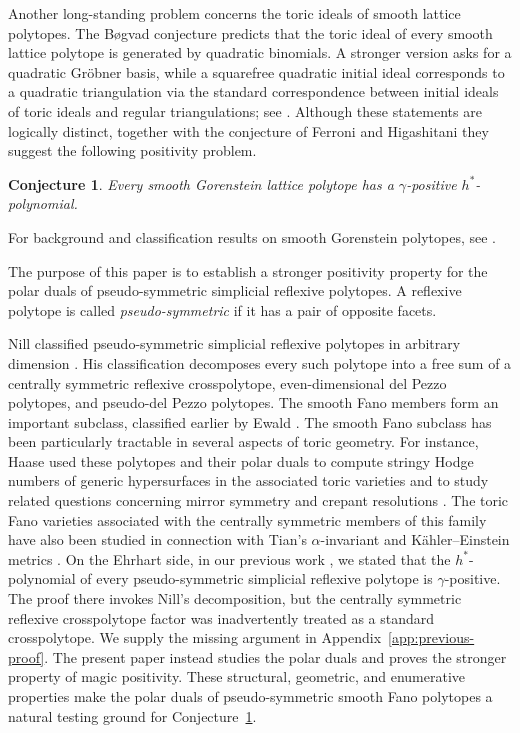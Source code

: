 \documentclass[12pt]{amsart}
\newtheorem{Conjecture}[Theorem]{Conjecture}
\theoremstyle{definition}
\begin{document}
Another long-standing problem concerns the toric ideals of smooth
lattice polytopes. The B{\o}gvad conjecture predicts that the toric ideal
of every smooth lattice polytope is generated by quadratic binomials.
A stronger version asks
for a quadratic Gr\"obner basis, while a squarefree quadratic initial ideal
corresponds to a quadratic triangulation via the standard correspondence
between initial ideals of toric ideals and regular triangulations; see
\cite[Chapter~8]{SturmfelsGBCP}.  Although these statements are logically
distinct, together with the conjecture of Ferroni and Higashitani they
suggest the following positivity problem.

\begin{Conjecture}\label{conj:smooth-gorenstein}
Every smooth Gorenstein lattice polytope has a $\gamma$-positive
$h^*$-polynomial.
\end{Conjecture}

For background and classification results on smooth Gorenstein polytopes,
see \cite{LorenzNill}.

The purpose of this paper is to establish a stronger positivity property
for the polar duals of pseudo-symmetric simplicial reflexive polytopes.
A reflexive polytope is called \emph{pseudo-symmetric} if it has a pair
of opposite facets.

Nill classified pseudo-symmetric simplicial reflexive polytopes in
arbitrary dimension \cite{NillPseudoSymmetric}.  His classification
decomposes every such polytope into a free sum of a centrally symmetric
reflexive crosspolytope, even-dimensional del Pezzo polytopes, and
pseudo-del Pezzo polytopes.  The smooth Fano members form an important
subclass, classified earlier by Ewald
\cite{Ewald,EwaldBook}.
The smooth Fano subclass has been particularly tractable in several
aspects of toric geometry.  
For
instance, Haase used these polytopes and their polar duals to compute
stringy Hodge numbers of generic hypersurfaces in the associated toric
varieties and to study related questions concerning mirror symmetry and
crepant resolutions \cite{HaaseThesis}.  The toric Fano varieties
associated with the centrally symmetric members of this family have also
been studied in connection with Tian's $\alpha$-invariant and
K\"ahler--Einstein metrics \cite{BatyrevSelivanova,SongAlpha}.  
On the Ehrhart side, in our previous work
\cite[Theorem~5.8]{OhsugiTsuchiyaLocally}, we stated that the
$h^*$-polynomial of every pseudo-symmetric simplicial reflexive polytope
is $\gamma$-positive.
The proof there invokes Nill's decomposition, but the centrally
symmetric reflexive crosspolytope factor was inadvertently treated as
a standard crosspolytope.
We supply the missing argument in Appendix~\ref{app:previous-proof}.
The present paper instead studies the polar duals and proves the
stronger property of magic positivity.
These structural, geometric,
and enumerative properties make the polar duals of pseudo-symmetric
smooth Fano polytopes a natural testing ground for
Conjecture~\ref{conj:smooth-gorenstein}.
\end{document}
